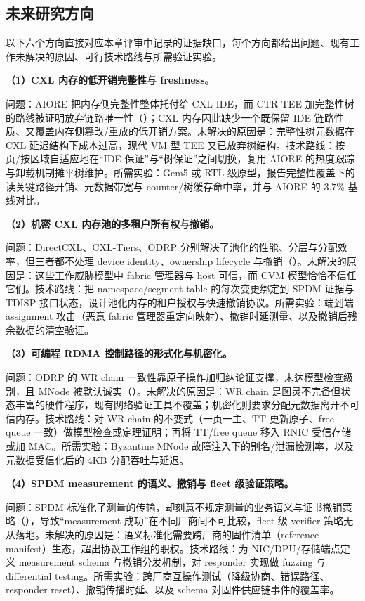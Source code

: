 \documentclass[11pt]{ctexart}
\begin{document}
\subsection{未来研究方向}
以下六个方向直接对应本章评审中记录的证据缺口，每个方向都给出问题、现有工作未解决的原因、可行技术路线与所需验证实验。\par
\noindent\textbf{（1）CXL 内存的低开销完整性与 freshness。}\par
问题：AIORE 把内存侧完整性整体托付给 CXL IDE，而 CTR TEE 加完整性树的路线被证明放弃链路唯一性（\cite{li2025aiore}）；CXL 内存因此缺少一个既保留 IDE 链路性质、又覆盖内存侧篡改/重放的低开销方案。未解决的原因是：完整性树元数据在 CXL 延迟结构下成本过高，现代 VM 型 TEE 又已放弃树结构。技术路线：按页/按区域自适应地在“IDE 保证”与“树保证”之间切换，复用 AIORE 的热度跟踪与卸载机制摊平树维护。所需实验：Gem5 或 RTL 级原型，报告完整性覆盖下的读关键路径开销、元数据带宽与 counter/树缓存命中率，并与 AIORE 的 3.7\% 基线对比。\par
\noindent\textbf{（2）机密 CXL 内存池的多租户所有权与撤销。}\par
问题：DirectCXL、CXL-Tiers、ODRP 分别解决了池化的性能、分层与分配效率，但三者都不处理 device identity、ownership lifecycle 与撤销（\cite{gouk2022directcxl,zhong2024cxltiers,wang2025odrp}）。未解决的原因是：这些工作威胁模型中 fabric 管理器与 host 可信，而 CVM 模型恰恰不信任它们。技术路线：把 namespace/segment table 的每次变更绑定到 SPDM 证据与 TDISP 接口状态，设计池化内存的租户授权与快速撤销协议。所需实验：端到端 assignment 攻击（恶意 fabric 管理器重定向映射）、撤销时延测量、以及撤销后残余数据的清空验证。\par
\noindent\textbf{（3）可编程 RDMA 控制路径的形式化与机密化。}\par
问题：ODRP 的 WR chain 一致性靠原子操作加归纳论证支撑，未达模型检查级别，且 MNode 被默认诚实（\cite{wang2025odrp}）。未解决的原因是：WR chain 是图灵不完备但状态丰富的硬件程序，现有网络验证工具不覆盖；机密化则要求分配元数据离开不可信内存。技术路线：对 WR chain 的不变式（一页一主、TT 更新原子、free queue 一致）做模型检查或定理证明；再将 TT/free queue 移入 RNIC 受信存储或加 MAC。所需实验：Byzantine MNode 故障注入下的别名/泄漏检测率，以及元数据受信化后的 4KB 分配吞吐与延迟。\par
\noindent\textbf{（4）SPDM measurement 的语义、撤销与 fleet 级验证策略。}\par
问题：SPDM 标准化了测量的传输，却刻意不规定测量的业务语义与证书撤销策略（\cite{dmtf_spdm_2025}），导致“measurement 成功”在不同厂商间不可比较，fleet 级 verifier 策略无从落地。未解决的原因是：语义标准化需要跨厂商的固件清单（reference manifest）生态，超出协议工作组的职权。技术路线：为 NIC/DPU/存储端点定义 measurement schema 与撤销分发机制，对 responder 实现做 fuzzing 与 differential testing。所需实验：跨厂商互操作测试（降级协商、错误路径、responder reset）、撤销传播时延、以及 schema 对固件供应链事件的覆盖率。\par
\end{document}
